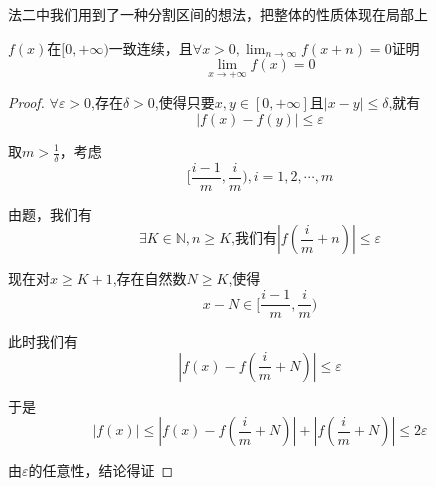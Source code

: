 \documentclass[lang=cn,10pt]{elegantbook}
\begin{document}
	\begin{remark}
		法二中我们用到了一种分割区间的想法，把整体的性质体现在局部上
	\end{remark}
	\begin{example}
		$f(x)$在$[0,+\infty)$一致连续，且$\forall x>0,\lim_{n\rightarrow \infty} f\left( x+n \right) =0$证明
		\begin{equation*}
			\lim_{x\rightarrow +\infty} f\left( x \right) =0
		\end{equation*}
	\end{example}
	\begin{proof}
		$\forall\varepsilon >0$,存在$\delta>0$,使得只要$x,y\in [0,+\infty]$且$|x-y|\le \delta$,就有
		\begin{equation*}
			|f(x)-f(y)|\le\varepsilon
		\end{equation*}
		
		取$m>\frac{1}{\delta}$，考虑
		\begin{equation*}
			[\frac{i-1}{m},\frac{i}{m}),i=1,2,\cdots,m
		\end{equation*}
		
		由题，我们有
		\begin{equation*}
			\exists K\in \mathbb{N},n\ge K \text{,我们有}|f(\frac{i}{m}+n)|\le \varepsilon
		\end{equation*}
		
		现在对$x\ge K+1$,存在自然数$N\ge K$,使得
		\begin{equation*}
			x-N\in [\frac{i-1}{m},\frac{i}{m})
		\end{equation*}
		
		此时我们有
		\begin{equation*}
			|f(x)-f(\frac{i}{m}+N)|\le \varepsilon
		\end{equation*}
		
		于是
		\begin{equation*}
			|f(x)|\le |f(x)-f(\frac{i}{m}+N)| +|f(\frac{i}{m}+N)|\le 2\varepsilon
		\end{equation*}
		
		由$\varepsilon$的任意性，结论得证
		
	\end{proof}
	
\end{document}
